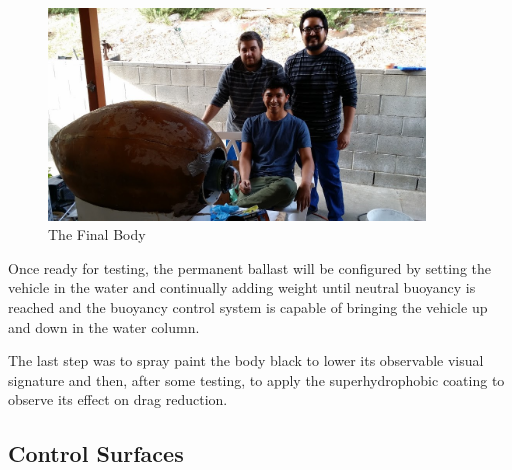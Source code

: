 \documentclass{report}
\begin{document}
\begin{figure}[H]
\centering
\includegraphics[width=10cm]{teamFglass}
\caption{The Final Body}
\end{figure}
Once ready for testing, the permanent ballast will be configured by setting the vehicle in the water and continually adding weight until neutral buoyancy is reached and the buoyancy control system is capable of bringing the vehicle up and down in the water column.\par
The last step was to spray paint the body black to lower its observable visual signature and then, after some testing, to apply the superhydrophobic coating to observe its effect on drag reduction.
\subsection{Control Surfaces}
\end{document}
